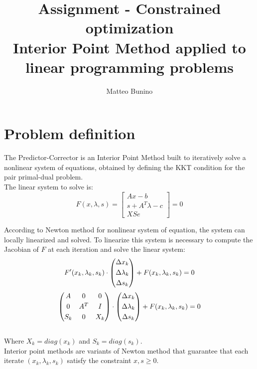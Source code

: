 \documentclass[]{article}
\title{Assignment - Constrained optimization\\Interior Point Method applied to linear programming
	problems}
\author{Matteo Bunino}
\begin{document}
\maketitle

\section{Problem definition}
The Predictor-Corrector is an Interior Point Method built to iteratively solve a nonlinear system of equations, obtained by defining the KKT condition for the pair primal-dual problem.\\
The linear system to solve is:
\begin{equation*}
	F(x,\lambda, s) = 
	\begin{bmatrix}
	Ax-b \\[0.3em]
	s+A^T\lambda-c \\[0.3em]
	XSe          
	\end{bmatrix}
	=0
\end{equation*}

According to Newton method for nonlinear system of equation, the system can locally linearized and solved. To linearize this system is necessary to compute the Jacobian of $F$ at each iteration and solve the linear system:
\begin{equation*}
	F'(x_k,\lambda_k, s_k) \cdot 
	\begin{pmatrix}
	\Delta x_k \\[0.3em]
	\Delta \lambda_k \\[0.3em]
	\Delta s_k           
	\end{pmatrix}
	+ F(x_k,\lambda_k, s_k)=0\\
\end{equation*}
\begin{equation*}
\begin{pmatrix}
A & 0 & 0 \\[0.3em]
0 & A^T & I \\[0.3em]
S_k & 0 & X_k           
\end{pmatrix}
\cdot 
\begin{pmatrix}
\Delta x_k \\[0.3em]
\Delta \lambda_k \\[0.3em]
\Delta s_k           
\end{pmatrix}
+ F(x_k,\lambda_k, s_k)=0\\
\end{equation*}
\\
Where $X_k=diag(x_k)$ and $S_k=diag(s_k)$.\\
Interior point methods are variants of Newton method that guarantee that each iterate $(x_k, \lambda_k, s_k)$ satisfy the constraint $x, s\geq0$.
\end{document}
